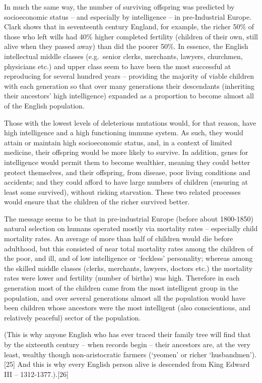 \documentclass[
]{book}
\begin{document}
In much the same way, the number of surviving offspring was predicted by socioeconomic status -- and especially by intelligence -- in pre-Industrial Europe. Clark shows that in seventeenth century England, for example, the richer 50\% of those who left wills had 40\% higher completed fertility (children of their own, still alive when they passed away) than did the poorer 50\%. In essence, the English intellectual middle classes (e.g.~senior clerks, merchants, lawyers, churchmen, physicians etc.) and upper class seem to have been the most successful at reproducing for several hundred years -- providing the majority of viable children with each generation so that over many generations their descendants (inheriting their ancestors' high intelligence) expanded as a proportion to become almost all of the English population.

Those with the lowest levels of deleterious mutations would, for that reason, have high intelligence and a high functioning immune system. As such, they would attain or maintain high socioeconomic status, and, in a context of limited medicine, their offspring would be more likely to survive. In addition, genes for intelligence would permit them to become wealthier, meaning they could better protect themselves, and their offspring, from disease, poor living conditions and accidents; and they could afford to have large numbers of children (ensuring at least some survived), without risking starvation. These two related processes would ensure that the children of the richer survived better.

The message seems to be that in pre-industrial Europe (before about 1800-1850) natural selection on humans operated mostly via mortality rates -- especially child mortality rates. An average of more than half of children would die before adulthood, but this consisted of near total mortality rates among the children of the poor, and ill, and of low intelligence or `feckless' personality; whereas among the skilled middle classes (clerks, merchants, lawyers, doctors etc.) the mortality rates were lower and fertility (number of births) was high. Therefore in each generation most of the children came from the most intelligent group in the population, and over several generations almost all the population would have been children whose ancestors were the most intelligent (also conscientious, and relatively peaceful) sector of the population.

(This is why anyone English who has ever traced their family tree will find that by the sixteenth century -- when records begin -- their ancestors are, at the very least, wealthy though non-aristocratic farmers (`yeomen' or richer `husbandmen').{[}25{]} And this is why every English person alive is descended from King Edward III -- 1312-1377.).{[}26{]}
\end{document}
